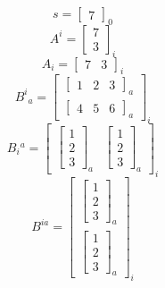\[
    s=\left[\begin{array}{c}7\end{array}\right]_{0}
\]
\[
    A^i=\left[\begin{array}{c}
            7
            \\
            3
        \end{array}\right]_{i}
\]
\[
    A_i=\left[\begin{array}{cc}7&3\end{array}\right]_{i}
\]
\[
    B^i{}_a=\left[\begin{array}{cc}
            \left[\begin{array}{lll}1&2&3\end{array}\right]_{a}
            \\
            \left[\begin{array}{lll}4&5&6\end{array}\right]_{a}
        \end{array}\right]_{i}
\]
\[
    B_i{}^a=\left[\begin{array}{cc}
            \left[\begin{array}{lll}
                          1
                          \\
                          2
                          \\
                          3\end{array}\right]_{a}
             &
            \left[\begin{array}{lll}
                          1
                          \\
                          2
                          \\
                          3\end{array}\right]_{a}
        \end{array}\right]_{i}
\]
\[
    B^{ia}=\left[\begin{array}{cc}
            \left[\begin{array}{lll}
                          1
                          \\
                          2
                          \\
                          3\end{array}\right]_{a}
            \\
            \left[\begin{array}{lll}
                          1
                          \\
                          2
                          \\
                          3\end{array}\right]_{a}
        \end{array}\right]_{i}
\]
